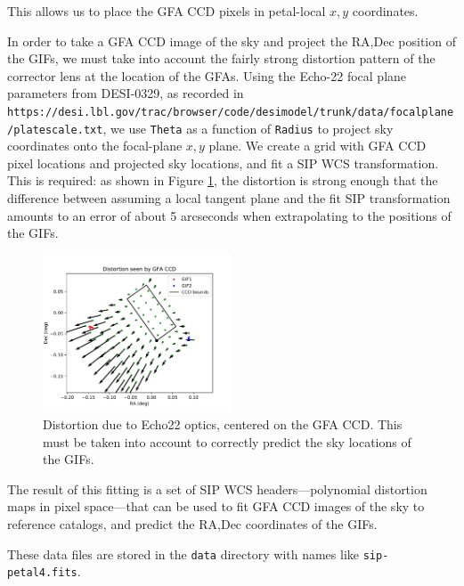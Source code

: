 \documentclass[10pt]{article}
\newcommand{\code}[1]{\texttt{#1}}
\begin{document}
This allows us to place the GFA CCD pixels in petal-local $x,y$
coordinates.

In order to take a GFA CCD image of the sky and project the RA,Dec
position of the GIFs, we must take into account the fairly strong
distortion pattern of the corrector lens at the location of the GFAs.
Using the Echo-22 focal plane parameters from DESI-0329, as recorded
in
\code{https://desi.lbl.gov/trac/browser/code/desimodel/trunk/data/focalplane/platescale.txt},
we use \code{Theta} as a function of \code{Radius} to project sky
coordinates onto the focal-plane $x,y$ plane.  We create a grid with
GFA CCD pixel locations and projected sky locations, and fit a SIP WCS
transformation.  This is required: as shown in Figure \ref{fig:sip},
the distortion is strong enough that the difference between assuming a
local tangent plane and the fit SIP transformation amounts to an error
of about 5 arcseconds when extrapolating to the positions of the GIFs.

\begin{figure}
  \begin{center}
    \includegraphics[width=0.5\textwidth]{distortion}
  \end{center}
  \caption{Distortion due to Echo22 optics, centered on the GFA CCD.
    This must be taken into account to correctly predict the sky
    locations of the GIFs.\label{fig:sip}}
\end{figure}

The result of this fitting is a set of SIP WCS headers---polynomial
distortion maps in pixel space---that can be used to fit GFA CCD
images of the sky to reference catalogs, and predict the RA,Dec
coordinates of the GIFs.

These data files are stored in the \code{data} directory with names like
\code{sip-petal4.fits}.
\end{document}
